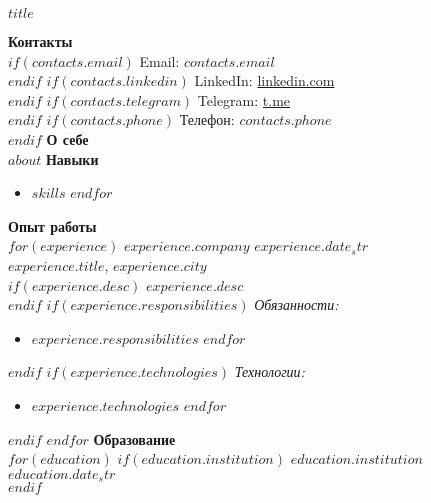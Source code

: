 \documentclass[a4paper,10pt]{article}
\begin{document}
\begin{center}
    \textbf{\huge $title$}
\end{center}
\vspace{0.5cm}
\textbf{Контакты} \\
$if(contacts.email)$ Email: \href{mailto:$contacts.email$}{$contacts.email$} \\ $endif$
$if(contacts.linkedin)$ LinkedIn: \href{$contacts.linkedin$}{linkedin.com} \\ $endif$
$if(contacts.telegram)$ Telegram: \href{$contacts.telegram$}{t.me} \\ $endif$
$if(contacts.phone)$ Телефон: $contacts.phone$ \\ $endif$
\vspace{0.5cm}
\textbf{О себе} \\
$about$
\vspace{0.5cm}
\textbf{Навыки} \\
\begin{itemize}
$for(skills)$
    \item $skills$
$endfor$
\end{itemize}
\vspace{0.5cm}
\textbf{Опыт работы} \\
$for(experience)$
    \textbf{$experience.company$} \hfill $experience.date_str$ \\
    $experience.title$, $experience.city$ \\
    $if(experience.desc)$ $experience.desc$ \\ $endif$
    $if(experience.responsibilities)$
    \textit{Обязанности:} \\
    \begin{itemize}
        $for(experience.responsibilities)$
        \item $experience.responsibilities$
        $endfor$
    \end{itemize}
    $endif$
    $if(experience.technologies)$
    \textit{Технологии:} \\
    \begin{itemize}
        $for(experience.technologies)$
        \item $experience.technologies$
        $endfor$
    \end{itemize}
    $endif$
    \vspace{0.2cm}
$endfor$
\textbf{Образование} \\
$for(education)$
    $if(education.institution)$ \textbf{$education.institution$} \hfill $education.date_str$ \\ $endif$
\end{document}
